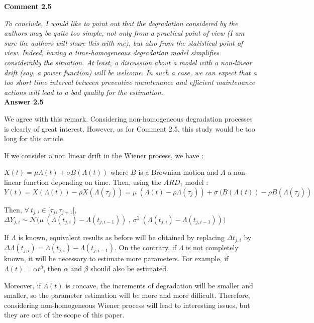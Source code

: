 { \bf Comment 2.5 }

{\it To conclude, I would like to point out that the degradation considered by the authors may be quite too simple, not only from a practical point of view (I am sure the authors will share this with me), but also from the statistical point of view. Indeed, having a time-homogeneous degradation model simplifies considerably the situation. At least, a discussion about a model with a non-linear drift (say, a power function) will be welcome. In such a case, we can expect that a too short time interval between preventive maintenance and efficient maintenance actions will lead to a bad quality for the estimation.}\\
 
{ \bf Answer 2.5 }

We agree with this remark. Considering non-homogeneous degradation processes is clearly of great interest. However, as for Comment 2.5, this study would be too long for this article. 

\noindent If we consider a non linear drift in the Wiener process, we have :

\noindent $X(t)=\mu \Lambda(t) +\sigma B (\Lambda (t))$ where $B$ is a Brownian motion and $\Lambda$ a non-linear function depending on time.
 Then, using the $ARD_1$ model :
 $Y(t)=X(\Lambda(t))- \rho X(\Lambda (\tau_j)) = \mu \ (\Lambda(t)-\rho \Lambda(\tau_j))+ \sigma\ (B(\Lambda(t))-\rho B (\Lambda (\tau_j))$

\noindent Then, $\forall\  t_{j,i} \in [ \tau_j,\tau_{j+1}[, $  $\Delta Y_{j,i}\sim \mathcal{N}\big(\mu\ (\Lambda(t_{j,i})-\Lambda(t_{j,i-1}))\ , \ \sigma^2\ (\Lambda(t_{j,i})-\Lambda(t_{j,i-1}))\big)$

\noindent If $\Lambda$ is known, equivalent results as before will be obtained by replacing $\Delta t_{j,i}$ by  $\Delta \Lambda(t_{j,i})=\Lambda(t_{j,i})-\Lambda(t_{j,i-1})$. On the contrary, if $\Lambda$ is not completely known, it will be necessary to estimate more parameters. For example, if $\Lambda(t)=\alpha t^{\beta}$, then $\alpha$ and $\beta$ should also be estimated.



Moreover, if $\Lambda(t)$ is concave, the increments of degradation will be smaller and smaller, so the parameter estimation will be more and more difficult. Therefore, considering non-homogeneous Wiener process will lead to interesting issues, but they are out of the scope of this paper. 


